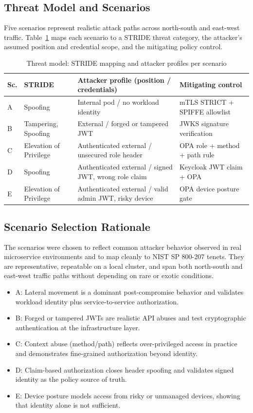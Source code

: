 \documentclass[conference]{IEEEtran}
\begin{document}
\subsection{Threat Model and Scenarios}
Five scenarios represent realistic attack paths across north-south and east-west traffic.
Table~\ref{tab:stride} maps each scenario to a STRIDE threat category, the attacker's
assumed position and credential scope, and the mitigating policy control.

\begin{table}[!t]
\caption{Threat model: STRIDE mapping and attacker profiles per scenario}
\label{tab:stride}
\centering
\scriptsize
\begin{tabularx}{\columnwidth}{l l >{\raggedright\arraybackslash}X >{\raggedright\arraybackslash}X}
\toprule
Sc. & STRIDE & Attacker profile (position / credentials) & Mitigating control \\
\midrule
A & Spoofing & Internal pod / no workload identity & mTLS STRICT + SPIFFE allowlist \\
B & Tampering, Spoofing & External / forged or tampered JWT & JWKS signature verification \\
C & Elevation of Privilege & Authenticated external / unsecured role header & OPA role + method + path rule \\
D & Spoofing & Authenticated external / signed JWT, wrong role claim & Keycloak JWT claim + OPA \\
E & Elevation of Privilege & Authenticated external / valid admin JWT, risky device & OPA device posture gate \\
\bottomrule
\end{tabularx}
\end{table}

\subsection{Scenario Selection Rationale}
The scenarios were chosen to reflect common attacker behavior observed in real
microservice environments and to map cleanly to NIST SP 800-207 tenets. They are
representative, repeatable on a local cluster, and span both north-south and east-west
traffic paths without depending on rare or exotic conditions.
\begin{itemize}[noitemsep, topsep=3pt, parsep=0pt, partopsep=0pt]
  \item A: Lateral movement is a dominant post-compromise behavior and validates
  workload identity plus service-to-service authorization.
  \item B: Forged or tampered JWTs are realistic API abuses and test cryptographic
  authentication at the infrastructure layer.
  \item C: Context abuse (method/path) reflects over-privileged access in practice
  and demonstrates fine-grained authorization beyond identity.
  \item D: Claim-based authorization closes header spoofing and validates signed
  identity as the policy source of truth.
  \item E: Device posture models access from risky or unmanaged devices, showing that
  identity alone is not sufficient.
\end{itemize}
\end{document}
